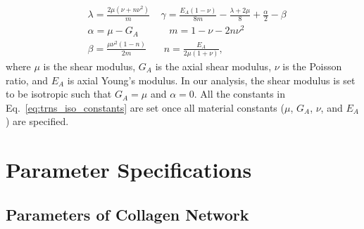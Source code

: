 \documentclass[]{interact}
\begin{document}
%
\begin{align}
&\lambda = \frac{2\mu (\nu+n\nu^2)}{m} \ \ \ \ \ \gamma = \frac{E_A(1-\nu)}{8m} - \frac{\lambda+2\mu}{8} + \frac{\alpha}{2} - \beta \nonumber\\
%
&\alpha = \mu - G_A \ \ \ \ \ \ \ \ \ \ \ \ \ \ m = 1 - \nu - 2 n\nu^2 \nonumber\\
%
&\beta = \frac{\mu \nu^2(1-n)}{2m} \ \ \ \ \ \ \ \ n = \frac{E_A}{2\mu(1+\nu)},
\label{eq:trns_iso_constants}
\end{align}
%
where $\mu$ is the shear modulus, $G_A$ is the axial shear modulus, $\nu$ is the Poisson ratio, and $E_A$ is axial Young's modulus. In our analysis, the shear modulus is set to be isotropic such that $G_A=\mu$ and $\alpha = 0$. All the constants in Eq.\ \eqref{eq:trns_iso_constants} are set once all material constants ($\mu$, $G_A$, $\nu$, and $E_A$) are specified. 

\section{Parameter Specifications}

\subsection{Parameters of Collagen Network}
\end{document}
